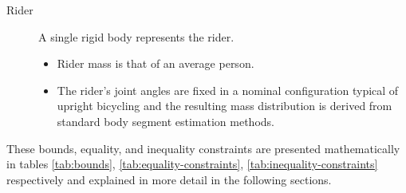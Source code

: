\documentclass{bmd2019a}
\begin{document}
\begin{description}
  \item[Rider] A single rigid body represents the rider.
    \begin{itemize}
      \item Rider mass is that of an average person.
      \item The rider's joint angles are fixed in a nominal configuration
        typical of upright bicycling and the resulting mass distribution is
        derived from standard body segment estimation methods.
    \end{itemize}

\end{description}

These bounds, equality, and inequality constraints are presented mathematically
in tables \ref{tab:bounds}, \ref{tab:equality-constraints},
\ref{tab:inequality-constraints} respectively and explained in more detail in
the following sections.
%
\end{document}

